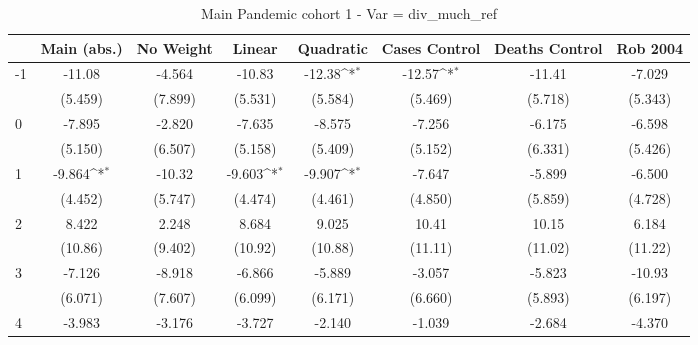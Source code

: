 \documentclass{article}
\begin{document}
{
\def\sym#1{\ifmmode^{#1}\else\(^{#1}\)\fi}
\begin{longtable}{l*{7}{c}}
\caption{Main Pandemic cohort 1 - Var = div\_much\_ref}\\
\hline\hline\endfirsthead\hline\endhead\hline\endfoot\endlastfoot
                &\multicolumn{1}{c}{Main (abs.)}&\multicolumn{1}{c}{No Weight}&\multicolumn{1}{c}{Linear}&\multicolumn{1}{c}{Quadratic}&\multicolumn{1}{c}{Cases Control}&\multicolumn{1}{c}{Deaths Control}&\multicolumn{1}{c}{Rob 2004}\\
\hline
-1              &   -11.08         &   -4.564         &   -10.83         &   -12.38\sym{*}  &   -12.57\sym{*}  &   -11.41         &   -7.029         \\
                &  (5.459)         &  (7.899)         &  (5.531)         &  (5.584)         &  (5.469)         &  (5.718)         &  (5.343)         \\
0               &   -7.895         &   -2.820         &   -7.635         &   -8.575         &   -7.256         &   -6.175         &   -6.598         \\
                &  (5.150)         &  (6.507)         &  (5.158)         &  (5.409)         &  (5.152)         &  (6.331)         &  (5.426)         \\
1               &   -9.864\sym{*}  &   -10.32         &   -9.603\sym{*}  &   -9.907\sym{*}  &   -7.647         &   -5.899         &   -6.500         \\
                &  (4.452)         &  (5.747)         &  (4.474)         &  (4.461)         &  (4.850)         &  (5.859)         &  (4.728)         \\
2               &    8.422         &    2.248         &    8.684         &    9.025         &    10.41         &    10.15         &    6.184         \\
                &  (10.86)         &  (9.402)         &  (10.92)         &  (10.88)         &  (11.11)         &  (11.02)         &  (11.22)         \\
3               &   -7.126         &   -8.918         &   -6.866         &   -5.889         &   -3.057         &   -5.823         &   -10.93         \\
                &  (6.071)         &  (7.607)         &  (6.099)         &  (6.171)         &  (6.660)         &  (5.893)         &  (6.197)         \\
4               &   -3.983         &   -3.176         &   -3.727         &   -2.140         &   -1.039         &   -2.684         &   -4.370         \\

\end{longtable}}
\end{document}
